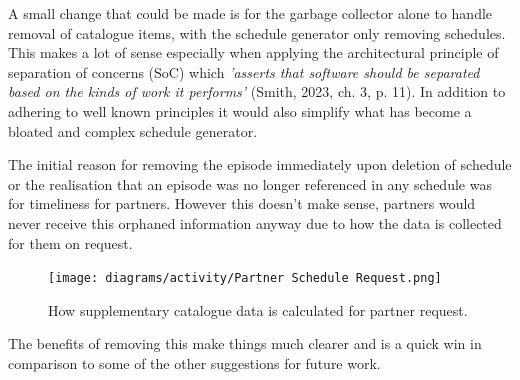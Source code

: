   A small change that could be made is for the garbage collector alone to handle removal of catalogue items, with the schedule generator only 
  removing schedules. This makes a lot of sense especially when applying the architectural principle of separation of concerns (SoC) which 
  \textit{'asserts that software should be separated based on the kinds of work it performs'} (Smith, 2023, ch. 3, p. 11). In addition to adhering 
  to well known principles it would also simplify what has become a bloated and complex schedule generator.

  The initial reason for removing the episode immediately upon deletion of schedule or the realisation that an episode was no longer referenced in 
  any schedule was for timeliness for partners. However this doesn't make sense, partners would never receive this orphaned information anyway due to 
  how the data is collected for them on request.

  \begin{figure}[H]
    \centering
    \texttt{[image: diagrams/activity/Partner Schedule Request.png]}
    \caption{How supplementary catalogue data is calculated for partner request.}
    \label{fig:partnerRequest}
  \end{figure}  

  The benefits of removing this make things much clearer and is a quick win in comparison to some of the other suggestions for future work.
  
\newpage
